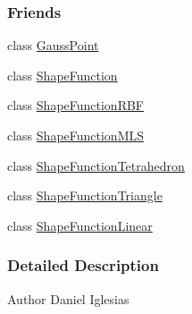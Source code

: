 \subsubsection*{Friends}
\begin{DoxyCompactItemize}
\item 
class \hyperlink{classmknix_1_1_point_a49d4fb4846aabd1919c5358170ff9da7}{Gauss\-Point}
\item 
class \hyperlink{classmknix_1_1_point_a65b2654dc4464f92687e22eb5a247f20}{Shape\-Function}
\item 
class \hyperlink{classmknix_1_1_point_ad76d1b525e65d47484187892160efd74}{Shape\-Function\-R\-B\-F}
\item 
class \hyperlink{classmknix_1_1_point_a07440917ac5f62def0ce649ad0066552}{Shape\-Function\-M\-L\-S}
\item 
class \hyperlink{classmknix_1_1_point_aa3a0c73566e859e80c29b9e691b31451}{Shape\-Function\-Tetrahedron}
\item 
class \hyperlink{classmknix_1_1_point_a64bc125443b7c740a25d032c8294c4db}{Shape\-Function\-Triangle}
\item 
class \hyperlink{classmknix_1_1_point_a141afa4d313293225cc307a84fa17756}{Shape\-Function\-Linear}
\end{DoxyCompactItemize}


\subsubsection{Detailed Description}
\begin{DoxyAuthor}{Author}
Daniel Iglesias 
\end{DoxyAuthor}


